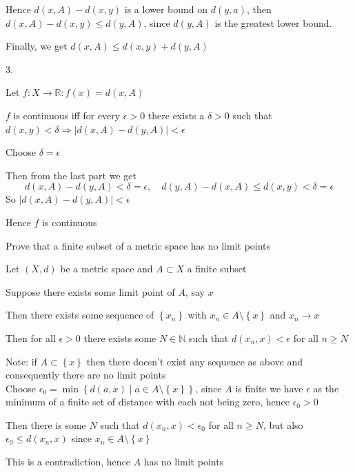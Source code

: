\documentclass{article}
\begin{document}
\begin{problem}
\begin{solution}
	Hence \( d(x,A) - d(x,y) \) is a lower bound on \( d(y,a) \), then \( d(x,A) - d(x,y) \le d(y,A) \), since \( d(y,A) \) is the greatest lower bound.

	Finally, we get \( d(x,A) \le d(x,y) + d(y,A) \)

\end{solution}

\begin{solution} 3.

	Let \( f \colon X \to \mathbb{R} \colon f(x) = d(x,A)  \)

	\( f \) is continuous iff for every \( \epsilon > 0  \) there exists a \( \delta > 0  \) such that \( d(x,y) < \delta \Rightarrow |d(x,A) - d(y,A)| < \epsilon \)

	Choose \( \delta = \epsilon \)

	Then from the last part we get
	\[
		d(x,A) - d(y,A) < \delta = \epsilon, \quad d(y,A) - d(x,A) \le d(x,y) < \delta = \epsilon
	\]
	So \( |d(x,A) - d(y,A)| < \epsilon \)

	Hence \( f \) is continuous

\end{solution}
\end{problem}

\begin{problem}
Prove that a finite subset of a metric space has no limit points

\begin{solution}
	Let \( (X,d) \) be a metric space and \( A \subset X \) a finite subset

	Suppose there exists some limit point of \( A \), say \( x \)

	Then there exists some sequence of \( \left\{ x_n \right\}  \) with \( x_n \in A \setminus \left\{ x \right\}  \) and \( x_n \to x \)

	Then for all \( \epsilon > 0  \) there exists some \( N \in \mathbb{N} \) such that \( d(x_n, x) < \epsilon \) for all \( n \geq N \)

	Note: if \( A \subset \left\{ x \right\}  \) then there doesn't exist any sequence as above and consequently there are no limit points
	\\

	Choose \( \epsilon_{0} = \min\left\{ d(a,x) \mid  a \in A\setminus \left\{ x \right\}  \right\}  \), since \( A \) is finite we have \( \epsilon \) as the minimum of a finite set of distance with each not being zero, hence \( \epsilon_{0} > 0 \)

	Then there is some \( N \) such that \( d(x_n,x) < \epsilon_{0} \) for all \( n \ge N \), but also \( \epsilon_{0} \le d(x_n,x) \) since \( x_n \in A \setminus \left\{ x \right\}  \)

	This is a contradiction, hence \( A \) has no limit points
\end{solution}
\end{problem}
\end{document}
